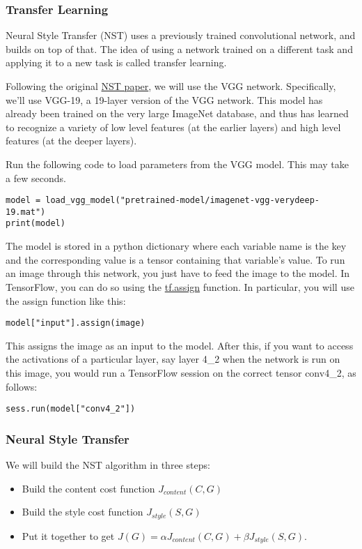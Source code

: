 \subsubsection{Transfer Learning}
Neural Style Transfer (NST) uses a previously trained convolutional network, and builds on top of that. The idea of using a network trained on a different task and applying it to a new task is called transfer learning.

Following the original \href{https://arxiv.org/abs/1508.06576}{NST paper}, we will use the VGG network. Specifically, we'll use VGG-19, a 19-layer version of the VGG network. This model has already been trained on the very large ImageNet database, and thus has learned to recognize a variety of low level features (at the earlier layers) and high level features (at the deeper layers).

Run the following code to load parameters from the VGG model. This may take a few seconds.
\begin{verbatim}
model = load_vgg_model("pretrained-model/imagenet-vgg-verydeep-19.mat")
print(model)
\end{verbatim}

The model is stored in a python dictionary where each variable name is the key and the corresponding value is a tensor containing that variable's value. To run an image through this network, you just have to feed the image to the model. In TensorFlow, you can do so using the \href{https://www.tensorflow.org/api_docs/python/tf/assign}{tf.assign} function. In particular, you will use the assign function like this:
\begin{verbatim}
model["input"].assign(image)
\end{verbatim}
This assigns the image as an input to the model. After this, if you want to access the activations of a particular layer, say layer 4\_2 when the network is run on this image, you would run a TensorFlow session on the correct tensor conv4\_2, as follows:
\begin{verbatim}
sess.run(model["conv4_2"])
\end{verbatim}



\subsubsection{Neural Style Transfer}
We will build the NST algorithm in three steps:
\begin{itemize}
\item Build the content cost function $J_{content}(C,G)$
\item Build the style cost function $J_{style}(S,G)$
\item Put it together to get $J(G) = \alpha J_{content}(C,G) + \beta J_{style}(S,G)$. 
\end{itemize}


